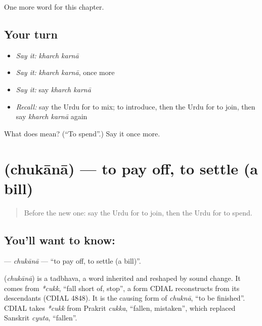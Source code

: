\begin{grammarlens}[title={What you've built}]
One more word for this chapter.
\end{grammarlens}

\subsection*{Your turn}
\begin{itemize}
\raggedright
  \item \emph{Say it:} \emph{kharch karnā}
  \item \emph{Say it:} \emph{kharch karnā}, once more
  \item \emph{Say it:} say \emph{kharch karnā}
  \item \emph{Recall:} say the Urdu for to mix; to introduce, then the Urdu for to join, then say \emph{kharch karnā} again
\end{itemize}

\begin{tcolorbox}[breakable,colback=teal!4,colframe=teal!35!black,title={Before you move on}]
What does   mean? (\textquotedblleft{}To spend\textquotedblright{}.) Say it once more.
\end{tcolorbox}
\section[\texorpdfstring{\ur{چکانا} (chukānā)}{چکانا (chukānā)}]{ (chukānā) — to pay off, to settle (a bill)}

\label{lesson:UR-C181-chukana}



\begin{quote}
Before the new one: say the Urdu for to join, then the Urdu for to spend.
\end{quote}

\subsection*{You'll want to know: }
\textbf{} — \emph{chukānā} — \textquotedblleft{}to pay off, to settle (a bill)\textquotedblright{}.

\begin{cousinweb}
\textbf{} (\emph{chukānā}) is a tadbhava, a word inherited and reshaped by sound change. It comes from \emph{*cukk}, \textquotedblleft{}fall short of, stop\textquotedblright{}, a form CDIAL reconstructs from its descendants (CDIAL 4848). It is the causing form of \emph{chuknā}, \textquotedblleft{}to be finished\textquotedblright{}. CDIAL takes \emph{*cukk} from Prakrit \emph{cukka}, \textquotedblleft{}fallen, mistaken\textquotedblright{}, which replaced Sanskrit \emph{cyuta}, \textquotedblleft{}fallen\textquotedblright{}.
\end{cousinweb}

